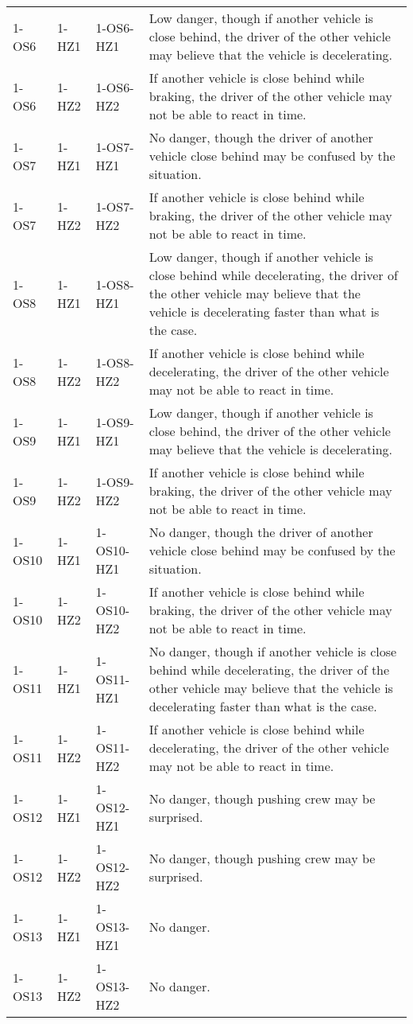 \begin{center}
\begin{tabular}{l|l|l|l}
1-OS6			& 1-HZ1	& 1-OS6-HZ1			& Low danger, though if another vehicle is close behind, the driver of the other vehicle may believe that the vehicle is decelerating. \\
1-OS6			& 1-HZ2	& 1-OS6-HZ2			& If another vehicle is close behind while braking, the driver of the other vehicle may not be able to react in time. \\
1-OS7			& 1-HZ1	& 1-OS7-HZ1			& No danger, though the driver of another vehicle close behind may be confused by the situation. \\
1-OS7			& 1-HZ2	& 1-OS7-HZ2			& If another vehicle is close behind while braking, the driver of the other vehicle may not be able to react in time. \\
1-OS8			& 1-HZ1	& 1-OS8-HZ1			& Low danger, though if another vehicle is close behind while decelerating, the driver of the other vehicle may believe that the vehicle is decelerating faster than what is the case. \\
1-OS8			& 1-HZ2	& 1-OS8-HZ2			& If another vehicle is close behind while decelerating, the driver of the other vehicle may not be able to react in time. \\
1-OS9			& 1-HZ1	& 1-OS9-HZ1			& Low danger, though if another vehicle is close behind, the driver of the other vehicle may believe that the vehicle is decelerating. \\
1-OS9			& 1-HZ2	& 1-OS9-HZ2			& If another vehicle is close behind while braking, the driver of the other vehicle may not be able to react in time. \\
1-OS10			& 1-HZ1	& 1-OS10-HZ1			& No danger, though the driver of another vehicle close behind may be confused by the situation. \\
1-OS10			& 1-HZ2	& 1-OS10-HZ2			& If another vehicle is close behind while braking, the driver of the other vehicle may not be able to react in time. \\
1-OS11			& 1-HZ1	& 1-OS11-HZ1			& No danger, though if another vehicle is close behind while decelerating, the driver of the other vehicle may believe that the vehicle is decelerating faster than what is the case. \\
1-OS11			& 1-HZ2	& 1-OS11-HZ2			& If another vehicle is close behind while decelerating, the driver of the other vehicle may not be able to react in time. \\
1-OS12			& 1-HZ1	& 1-OS12-HZ1			& No danger, though pushing crew may be surprised. \\
1-OS12			& 1-HZ2	& 1-OS12-HZ2			& No danger, though pushing crew may be surprised. \\
1-OS13			& 1-HZ1	& 1-OS13-HZ1			& No danger. \\
1-OS13			& 1-HZ2	& 1-OS13-HZ2			& No danger.
\end{tabular}
\end{center}

